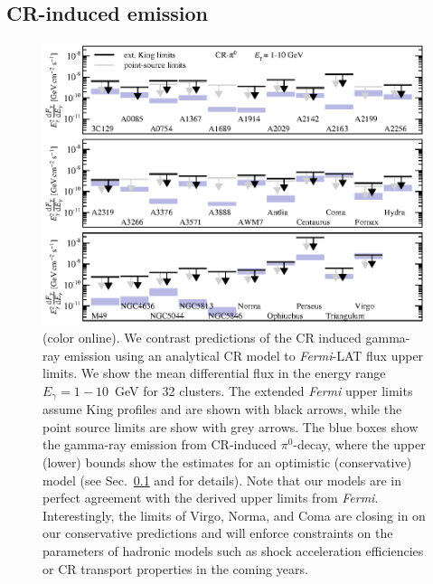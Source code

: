 \documentclass[10pt,aps,pra,reprint,amsmath,amsfonts,amssymb,showpacs,nofootinbib,floatfix]{revtex4-1}
\newcommand{\Fermi}{{\em Fermi}\xspace}
\newcommand{\colo}{(color online). }
\begin{document}
\subsection{CR-induced emission}
\label{sec:CRemission}
\begin{figure}
\begin{minipage}{2.0\columnwidth}
  \includegraphics[width=0.99\columnwidth]{figures/Fermi.comp.CR.diff.eps}
  \caption{\colo We contrast predictions of the CR
    induced gamma-ray emission using an analytical CR model \protect
    \cite{2010MNRAS.409..449P} to \Fermi-LAT flux upper limits. We
    show the mean differential flux in the energy range
    $E_\gamma=1-10$~GeV for 32 clusters. The extended \Fermi upper
    limits assume King profiles and are shown with black arrows, while
    the point source limits are show with grey arrows. The blue boxes
    show the gamma-ray emission from CR-induced $\pi^0$-decay, where
    the upper (lower) bounds show the estimates for an optimistic
    (conservative) model (see Sec.~\ref{sec:CRemission} and
    \cite{2010MNRAS.409..449P} for details). Note that our models are
    in perfect agreement with the derived upper limits from
    \Fermi. Interestingly, the limits of Virgo, Norma, and Coma are
    closing in on our conservative predictions and will enforce
    constraints on the parameters of hadronic models such as shock
    acceleration efficiencies or CR transport properties in the coming
    years.}
 \label{fig15}
\end{minipage}
\end{figure}
\end{document}
